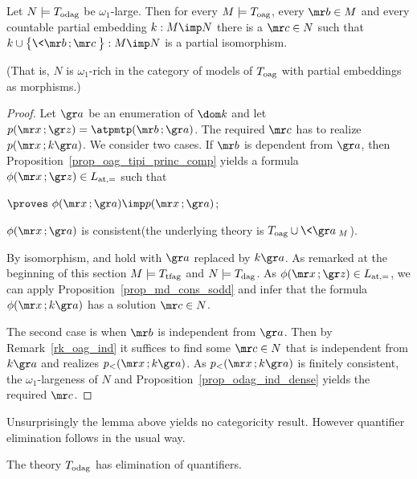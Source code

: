 \begin{lemma}\label{lem_odag_rich}
  Let $N\models T_{\rm odag}$ be $\omega_1$-large.
  Then for every $M\models T_{\rm oag}$, every ${\mr b}\in M$ and every countable partial embedding $k:M\imp N$ there is a ${\mr c}\in N$ such that $k\cup\big\{\<{\mr b}\,;{\mr c}\>\big\}:M\imp N$ is a partial isomorphism.
  
  (That is, $N$ is $\omega_1$-rich in the category of models of $T_{\rm oag}$ with partial embeddings as morphisms.)
\end{lemma}

\begin{proof}
  Let ${\gr a}$ be an enumeration of $\dom k$ and let $p({\mr x}\,;{\gr z})=\atpmtp({\mr b}\,;{\gr a})$.
  The required ${\mr c}$ has to realize $p({\mr x}\,;k{\gr a})$.
  We consider two cases.
  If ${\mr b}$ is dependent from ${\gr a}$, then Proposition~\ref{prop_oag_tipi_princ_comp} yields a formula $\phi({\mr x}\,;{\gr z})\in L_{\rm at,=}$ such that 

  \noindent{}\hspace{5ex} $\proves\ \phi({\mr x}\,;{\gr a})\imp p({\mr x}\,;{\gr a})$;

  \noindent{}\hspace{5ex} $\phi({\mr x} \,;{\gr a})$ is consistent\hfill (the underlying theory is $T_{\rm oag}\cup\<{\gr a}\>_M$).

  By isomorphism,  and  hold with ${\gr a}$ replaced by $k{\gr a}$.
  As remarked at the beginning of this section $M\models T_{\rm tfag}$ and $N\models T_{\rm dag}$.
  As  $\phi({\mr x}\,;{\gr z})\in L_{\rm at, =}$, we can apply Proposition~\ref{prop_md_cons_sodd} and infer that the formula $\phi({\mr x}\,;k{\gr a})$ has a solution ${\mr c} \in N$.

  The second case is when ${\mr b}$ is independent from ${\gr a}$.
  Then by Remark~\ref{rk_oag_ind} it suffices to find some ${\mr c}\in N$ that is independent from $k{\gr a}$ and realizes $p_<({\mr x}\,;k{\gr a})$.
  As $p_<({\mr x}\,;k{\gr a})$ is finitely consistent, the $\omega_1$-largeness of $N$ and  Proposition~\ref{prop_odag_ind_dense} yields the required ${\mr c}$.
\end{proof}

Unsurprisingly the lemma above yields no categoricity result.
%
However quantifier elimination follows in the usual way.

\begin{corollary}
  The theory $T_{\rm odag}$ has elimination of quantifiers.
\end{corollary}
  
